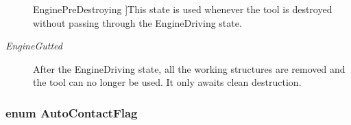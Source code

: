 \begin{Desc}
\begin{description}
{\hypertarget{namespaceKatabatic_ab9e409db5feff0bdbc85e90e2a029cdaafee0f47ec435d9c4e49b98a47683ad03}{Engine\-Pre\-Destroying}\label{namespaceKatabatic_ab9e409db5feff0bdbc85e90e2a029cdaafee0f47ec435d9c4e49b98a47683ad03}
}]This state is used whenever the tool is destroyed without passing through the Engine\-Driving state. \item[{\em 
\hypertarget{namespaceKatabatic_ab9e409db5feff0bdbc85e90e2a029cdaafb5f961d4cad2bb9fbda71204061c877}{Engine\-Gutted}\label{namespaceKatabatic_ab9e409db5feff0bdbc85e90e2a029cdaafb5f961d4cad2bb9fbda71204061c877}
}]After the Engine\-Driving state, all the working structures are removed and the tool can no longer be used. It only awaits clean destruction. \end{description}
\end{Desc}
\hypertarget{namespaceKatabatic_a4950b7142b9024cae2693cd44bccdc24}{
\subsubsection[{Auto\-Contact\-Flag}]{\setlength{\rightskip}{0pt plus 5cm}enum {\bf Auto\-Contact\-Flag}}}\label{namespaceKatabatic_a4950b7142b9024cae2693cd44bccdc24}
